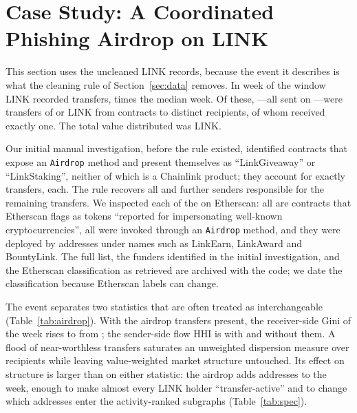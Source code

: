 \section{Case Study: A Coordinated Phishing Airdrop on LINK}
\label{sec:airdrop}

This section uses the uncleaned LINK records, because the event it describes
is what the cleaning rule of Section~\ref{sec:data} removes. In week
 of the window LINK recorded  transfers,
 times the median week. Of these,
---all sent on ---were transfers of
 or  LINK from  contracts to
 distinct recipients,  of whom
received exactly one. The total value distributed was 
LINK.

Our initial manual investigation, before the rule existed, identified 
contracts that expose an \texttt{Airdrop} method and present
themselves as ``LinkGiveaway'' or ``LinkStaking'', neither of which is a
Chainlink product; they account for exactly 
transfers,  each. The rule recovers all  and
 further senders responsible for the remaining
 transfers. We inspected each of the 
on Etherscan: all are contracts that Etherscan flags as tokens ``reported for
impersonating well-known cryptocurrencies'', all were invoked through an
\texttt{Airdrop} method, and they were deployed by 
addresses under names such as LinkEarn, LinkAward and BountyLink. The full
list, the funders identified in the initial investigation, and the Etherscan
classification as retrieved are archived with the code; we date the
classification because Etherscan labels can change.

The event separates two statistics that are often treated as
interchangeable (Table~\ref{tab:airdrop}). With the airdrop transfers
present, the receiver-side Gini of the week rises to 
from ; the sender-side flow HHI is
 with and  without them.
A flood of near-worthless transfers saturates an unweighted dispersion
measure over recipients while leaving value-weighted market structure
untouched. Its effect on structure is larger than on either statistic: the
airdrop adds  addresses to the week, enough to make
almost every LINK holder ``transfer-active'' and to change which addresses
enter the activity-ranked subgraphs (Table~\ref{tab:spec}).

